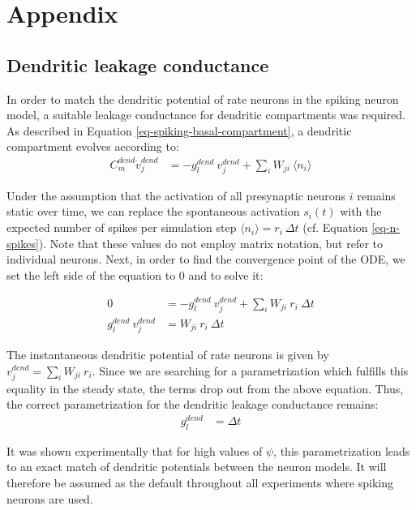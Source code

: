 
\chapter{Appendix}

\section{Dendritic leakage conductance}\label{sec-gl-dend}

In order to match the dendritic potential of rate neurons  in the spiking neuron model, a suitable leakage conductance
for dendritic compartments was required. As described in Equation \ref{eq-spiking-basal-compartment}, a dendritic
compartment evolves according to:
\begin{align}
  C_m^{dend} \dot{v}_j^{dend} & = -g_l^{dend} \  v_j^{dend} + \sum_i W_{ji} \    \langle \textit{n}_i \rangle
\end{align}

Under the assumption that the activation of all presynaptic neurons $i$ remains static over time, we can replace the
spontaneous activation $s_i(t)$ with the expected number of spikes per simulation step $\langle \textit{n}_i \rangle =
  r_i \ \Delta t$ (cf. Equation \ref{eq-n-spikes}). Note that these values do not employ matrix notation, but refer to
individual neurons. Next, in order to find the convergence point of the ODE, we set the left side of the equation to $0$
and to solve it:

\begin{align}
  0                        & = -g_l^{dend} \  v_j^{dend} + \sum_i W_{ji} \    r_i \ \Delta t \\
  g_l^{dend} \  v_j^{dend} & = W_{ji} \    r_i \ \Delta t
\end{align}

The instantaneous dendritic potential of rate neurons is given by $v_j^{dend} = \sum_i W_{ji} \ r_i$. Since we are
searching for a parametrization which fulfills this equality in the steady state, the terms drop out from the above
equation. Thus, the correct parametrization for the dendritic leakage conductance remains:
\begin{align}
  g_l^{dend} & = \Delta t
\end{align}

It was shown experimentally that for high values of $\psi$, this parametrization leads to an exact match of dendritic
potentials between the neuron models. It will therefore be assumed as the default throughout all experiments where
spiking neurons are used. \newline

